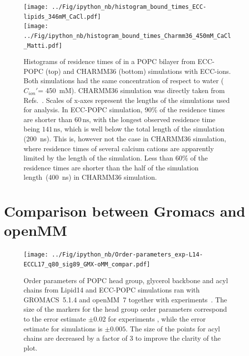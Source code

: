 \documentclass[journal=jpcbfk]{achemso}
\begin{document}
\begin{figure}[!h]
  \centering
  \texttt{[image: ../Fig/ipython\_nb/histogram\_bound\_times\_ECC-lipids\_346mM\_CaCl.pdf]} \\
  \texttt{[image: ../Fig/ipython\_nb/histogram\_bound\_times\_Charmm36\_450mM\_CaCl\_Matti.pdf]}
  \caption{\label{fig:hist_residence_times}
   Histograms of residence times of  in a POPC bilayer
   from ECC-POPC (top) and CHARMM36 (bottom) simulations with ECC-ions.
   Both simulations had the same concentration of  respect to water ($C_{ion}'$= 450~mM).
   CHARMM36 simulation was directly taken from Refs.~.
   Scales of x-axes represent the lengths of the simulations used for analysis.
   In ECC-POPC simulation, 90\% of the residence times are
   shorter than $60\,\mathrm{ns}$, %
   with the longest observed residence time being $141\,\mathrm{ns}$,
   which is well below the total length of the simulation (200~ns).
   This is, however not the case in CHARMM36 simulation,
   where residence times of several calcium cations are    
   apparently limited by the length of the simulation.
   Less than 60\% of the residence times are
   shorter than the half of the simulation length~(400~ns)
   in CHARMM36 simulation.
  }
\end{figure}

\newpage
\section{Comparison between Gromacs and openMM}

\begin{figure}[!h]
  \centering
  \texttt{[image: ../Fig/ipython\_nb/Order-parameters\_exp-L14-ECCL17\_q80\_sig89\_GMX-oMM\_compar.pdf]}
  \caption{\label{fig:ordPars_actual_GMX_oMM_compar}
    Order parameters of POPC head group, glycerol backbone and acyl chains 
    from Lipid14 \cite{dickson14} and ECC-POPC simulations ran
    with GROMACS~5.1.4 \cite{Abraham15} and openMM~7 \cite{openmm7} 
    together with experiments~\cite{ferreira13}.
    The size of the markers for the head group order parameters correspond to
    the error estimate $\pm 0.02$ for experiments \cite{botan15,ollila16},
    while the error estimate for simulations is $\pm 0.005$.
    The size of the points for acyl chains are decreased by a factor of 3 to improve the clarity of the plot.
  }
\end{figure}
\end{document}
